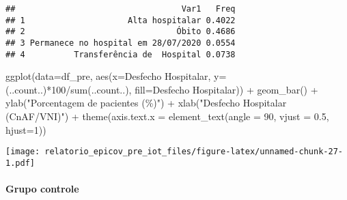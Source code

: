 \documentclass[
]{article}
\newenvironment{Shaded}{\begin{snugshade}}{\end{snugshade}}
\newcommand{\AttributeTok}[1]{\textcolor[rgb]{0.77,0.63,0.00}{#1}}
\newcommand{\DecValTok}[1]{\textcolor[rgb]{0.00,0.00,0.81}{#1}}
\newcommand{\FloatTok}[1]{\textcolor[rgb]{0.00,0.00,0.81}{#1}}
\newcommand{\FunctionTok}[1]{\textcolor[rgb]{0.00,0.00,0.00}{#1}}
\newcommand{\NormalTok}[1]{#1}
\newcommand{\SpecialCharTok}[1]{\textcolor[rgb]{0.00,0.00,0.00}{#1}}
\newcommand{\StringTok}[1]{\textcolor[rgb]{0.31,0.60,0.02}{#1}}
\begin{document}
\begin{Shaded}
\end{Shaded}

\begin{verbatim}
##                                  Var1   Freq
## 1                     Alta hospitalar 0.4022
## 2                               Óbito 0.4686
## 3 Permanece no hospital em 28/07/2020 0.0554
## 4          Transferência de  Hospital 0.0738
\end{verbatim}

\begin{Shaded}
\begin{Highlighting}[]
\FunctionTok{ggplot}\NormalTok{(}\AttributeTok{data=}\NormalTok{df\_pre, }\FunctionTok{aes}\NormalTok{(}\AttributeTok{x=}\StringTok{\textasciigrave{}}\AttributeTok{Desfecho Hospitalar}\StringTok{\textasciigrave{}}\NormalTok{, }\AttributeTok{y=}\NormalTok{(..count..)}\SpecialCharTok{*}\DecValTok{100}\SpecialCharTok{/}\FunctionTok{sum}\NormalTok{(..count..), }\AttributeTok{fill=}\StringTok{\textasciigrave{}}\AttributeTok{Desfecho Hospitalar}\StringTok{\textasciigrave{}}\NormalTok{)) }\SpecialCharTok{+}
  \FunctionTok{geom\_bar}\NormalTok{() }\SpecialCharTok{+}
  \FunctionTok{ylab}\NormalTok{(}\StringTok{"Porcentagem de pacientes (\%)"}\NormalTok{) }\SpecialCharTok{+}
  \FunctionTok{xlab}\NormalTok{(}\StringTok{"Desfecho Hospitalar (CnAF/VNI)"}\NormalTok{) }\SpecialCharTok{+}
  \FunctionTok{theme}\NormalTok{(}\AttributeTok{axis.text.x =} \FunctionTok{element\_text}\NormalTok{(}\AttributeTok{angle =} \DecValTok{90}\NormalTok{, }\AttributeTok{vjust =} \FloatTok{0.5}\NormalTok{, }\AttributeTok{hjust=}\DecValTok{1}\NormalTok{))}
\end{Highlighting}
\end{Shaded}

\texttt{[image: relatorio\_epicov\_pre\_iot\_files/figure-latex/unnamed-chunk-27-1.pdf]}

\hypertarget{grupo-controle-6}{%
\paragraph{\texorpdfstring{\textbf{Grupo
controle}}{Grupo controle}}\label{grupo-controle-6}}
\end{document}
